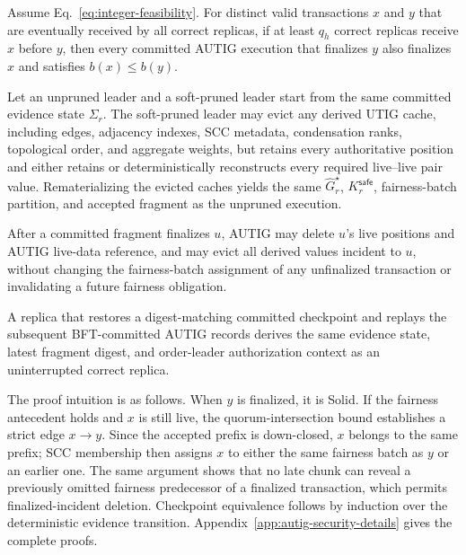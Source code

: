 \begin{theorem}
\label{thm:batch-fairness}
Assume Eq.~\eqref{eq:integer-feasibility}.  For distinct valid transactions
$x$ and $y$ that are eventually received by all correct replicas, if at least
$q_h$ correct replicas receive $x$ before $y$, then every committed AUTIG
execution that finalizes $y$ also finalizes $x$ and satisfies $b(x)\le b(y)$.
\end{theorem}

\begin{theorem}
\label{thm:pruning_safety}
Let an unpruned leader and a soft-pruned leader start from the same committed
evidence state $\Sigma_r$.  The soft-pruned leader may evict any derived UTIG
cache, including edges, adjacency indexes, SCC metadata, condensation ranks,
topological order, and aggregate weights, but retains every authoritative
position and either retains or deterministically reconstructs every required
live--live pair value.  Rematerializing the evicted caches yields the same
$\widehat G_r^\star$, $K_r^{\mathsf{safe}}$, fairness-batch partition, and accepted
fragment as the unpruned execution.
\end{theorem}

\begin{theorem}
\label{thm:hard-deletion}
After a committed fragment finalizes $u$, AUTIG may delete $u$'s live
positions and AUTIG live-data reference, and may evict all derived values
incident to $u$, without changing the fairness-batch assignment of any
unfinalized transaction or invalidating a future fairness obligation.
\end{theorem}

\begin{theorem}
\label{thm:recovery}
A replica that restores a digest-matching committed checkpoint and replays the
subsequent BFT-committed AUTIG records derives the same evidence state, latest
fragment digest, and order-leader authorization context as an uninterrupted
correct replica.
\end{theorem}

The proof intuition is as follows.  When $y$ is finalized, it is Solid.  If
the fairness antecedent holds and $x$ is still live, the quorum-intersection
bound establishes a strict edge $x\to y$.  Since the accepted prefix is
down-closed, $x$ belongs to the same prefix; SCC membership then assigns $x$
to either the same fairness batch as $y$ or an earlier one.  The same argument
shows that no late chunk can reveal a previously omitted fairness predecessor
of a finalized transaction, which permits finalized-incident deletion.
Checkpoint equivalence follows by induction over the deterministic evidence
transition.  Appendix~\ref{app:autig-security-details} gives the complete
proofs.


